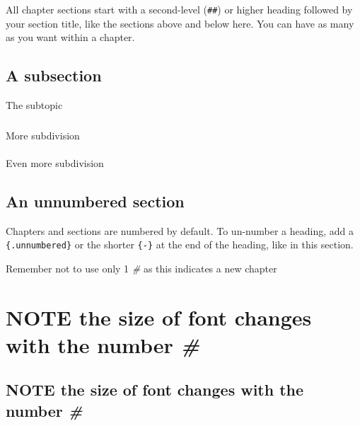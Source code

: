 \documentclass[
]{book}
\theoremstyle{definition}
\theoremstyle{definition}
\theoremstyle{definition}
\theoremstyle{definition}
\theoremstyle{remark}
\begin{document}
All chapter sections start with a second-level (\texttt{\#\#}) or higher heading followed by your section title, like the sections above and below here. You can have as many as you want within a chapter.

\hypertarget{a-subsection}{%
\subsection*{A subsection}\label{a-subsection}}

The subtopic

\hypertarget{section-2}{%
\subsubsection{}\label{section-2}}

More subdivision

\hypertarget{section-3}{%
\paragraph{}\label{section-3}}

Even more subdivision

\hypertarget{an-unnumbered-section}{%
\subsection*{An unnumbered section}\label{an-unnumbered-section}}

Chapters and sections are numbered by default. To un-number a heading, add a \texttt{\{.unnumbered\}} or the shorter \texttt{\{-\}} at the end of the heading, like in this section.

Remember not to use only 1 \emph{\#} as this indicates a new chapter

\hypertarget{note-the-size-of-font-changes-with-the-number}{%
\section{\texorpdfstring{NOTE the size of font changes with the number \emph{\#}}{NOTE the size of font changes with the number \#}}\label{note-the-size-of-font-changes-with-the-number}}

\hypertarget{note-the-size-of-font-changes-with-the-number-1}{%
\subsection{\texorpdfstring{NOTE the size of font changes with the number \emph{\#}}{NOTE the size of font changes with the number \#}}\label{note-the-size-of-font-changes-with-the-number-1}}
\end{document}
